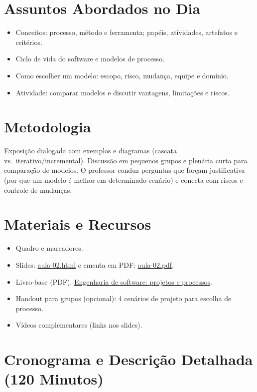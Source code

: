 \documentclass[12pt,a4paper]{article}
\begin{document}
\section{Assuntos Abordados no Dia}
\begin{itemize}[leftmargin=*,itemsep=0.25em]
  \item Conceitos: processo, método e ferramenta; papéis, atividades, artefatos e critérios.
  \item Ciclo de vida do software e modelos de processo.
  \item Como escolher um modelo: escopo, risco, mudança, equipe e domínio.
  \item Atividade: comparar modelos e discutir vantagens, limitações e riscos.
\end{itemize}

\section{Metodologia}
Exposição dialogada com exemplos e diagramas (cascata vs.\ iterativo/incremental). Discussão em pequenos grupos e plenária curta para comparação de modelos. O professor conduz perguntas que forçam justificativa (por que um modelo é melhor em determinado cenário) e conecta com riscos e controle de mudanças.

\section{Materiais e Recursos}
\begin{itemize}[leftmargin=*,itemsep=0.25em]
  \item Quadro e marcadores.
  \item Slides: \href{aula-02.html}{aula-02.html} e ementa em PDF: \href{aula-02.pdf}{aula-02.pdf}.
  \item Livro-base (PDF): \href{../99-Materiais/Engenharia%20de%20software%20projetos%20e%20processos%20by%20Wilson%20de%20P%C3%A1dua%20Paula%20Filho%20.epub.pdf}{Engenharia de software: projetos e processos}.
  \item Handout para grupos (opcional): 4 cenários de projeto para escolha de processo.
  \item Vídeos complementares (links nos slides).
\end{itemize}

\section{Cronograma e Descrição Detalhada (120 Minutos)}
\end{document}
